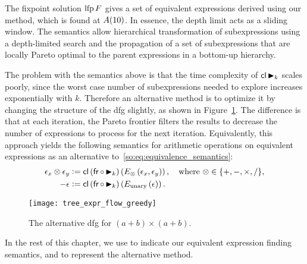 The fixpoint solution $\operatorname{\mathrm{lfp}} F$ gives a set of equivalent expressions derived
using our method, which is found at $A({10})$. In essence, the depth limit
acts as a sliding window.  The semantics allow hierarchical transformation of
subexpressions using a depth-limited search and the propagation of a set of
subexpressions that are locally Pareto optimal to the parent expressions in a
bottom-up hierarchy.

The problem with the semantics above is that the time complexity of $\operatorname{\mathsf{cl}}
\operatorname{\blacktriangleright}_k$ scales poorly, since the worst case number of subexpressions needed
to explore increases exponentially with $k$. Therefore an alternative method
is to optimize it by changing the structure of the \gls{dfg} slightly, as
shown in Figure~\ref{so:fig:tree_expr_flow_greedy}.  The difference is that
at each iteration, the Pareto frontier filters the results to decrease the
number of expressions to process for the next iteration.  Equivalently, this
approach yields the following semantics for arithmetic operations on equivalent
expressions as an alternative to~\eqref{so:eq:equivalence_semantics}:
\begin{equation}
    \begin{aligned}
        \epsilon_x \otimes \epsilon_y &\vcentcolon=
            \operatorname{\mathsf{cl}} \left( \operatorname{\mathsf{fr}} \circ \operatorname{\blacktriangleright}_k \right) \left(
                E_\otimes \left( \epsilon_x, \epsilon_y \right)
            \right), \quad\text{where~} \otimes\in\{ +, -, \times, / \}, \\
        -\epsilon &\vcentcolon=
            \operatorname{\mathsf{cl}} \left( \operatorname{\mathsf{fr}} \circ \operatorname{\blacktriangleright}_k \right) \left(
                E_{\mathrm{unary}} \left( \epsilon \right)
            \right).
    \end{aligned}
    \label{so:eq:equivalence_semantics_alt}
\end{equation}
\begin{figure}[ht]
    \centering
    \texttt{[image: tree\_expr\_flow\_greedy]}
    \caption{The alternative \gls{dfg} for $(a + b) \times (a + b)$.
    }\label{so:fig:tree_expr_flow_greedy}
\end{figure}

In the rest of this chapter, we use \frontiertrace{} to indicate our equivalent
expression finding semantics, and \greedytrace{} to represent the alternative
method.


